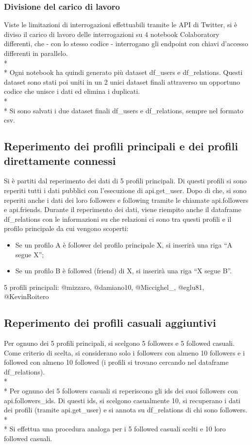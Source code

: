 \documentclass[a4paper, 12pt, twoside]{article}
\begin{document}
\subsubsection{Divisione del carico di lavoro}
Viste le limitazioni di interrogazioni effettuabili tramite le API di Twitter, si è diviso il carico di lavoro delle interrogazioni su 4 notebook Colaboratory differenti, che - con lo stesso codice -  interrogano gli endpoint con chiavi d’accesso differenti in parallelo. \\* \\*
Ogni notebook ha quindi generato più dataset df\_users e df\_relations. Questi dataset sono stati poi uniti in un 2 unici dataset finali attraverso un opportuno codice che unisce i dati ed elimina i duplicati. \\* \\*
Si sono salvati i due dataset finali df\_users e df\_relations, sempre nel formato csv.


\subsection{Reperimento dei profili principali e dei profili direttamente connessi} 
Si è partiti dal reperimento dei dati di 5 profili principali. Di questi profili si sono reperiti tutti i dati pubblici con l'esecuzione di api.get\_user. Dopo di che, si sono reperiti anche i dati dei loro followers e following tramite le chiamate api.followers e api.friends. Durante il reperimento dei dati, viene riempito anche il dataframe df\_relations con le informazioni su che relazioni ci sono tra questi profili e il profilo principale da cui vengono scoperti:
\begin{itemize}
    \item Se un profilo A è follower del profilo principale X, si inserirà una riga “A segue X”;
    \item Se un profilo B è followed (friend) di X, si inserirà una riga “X segue B”.
\end{itemize}
5 profili principali:    @mizzaro, @damiano10, @Miccighel\_, @eglu81, @KevinRoitero


\subsection{Reperimento dei profili casuali aggiuntivi}
Per ognuno dei 5 profili principali, si scelgono 5 followers e 5 followed casuali. Come criterio di scelta, si considerano solo i followers con almeno 10 followers e i followed con almeno 10 followed (i profili si trovano cercando nel dataframe df\_relations). \\* \\*
Per ognuno dei 5 followers casuali si reperiscono gli ids dei suoi followers con  api.followers\_ids. Di questi ids, si scelgono casualmente 10, si recuperano i dati dei profili (tramite  api.get\_user) e si annota su df\_relations di chi sono followers. \\* \\*
Si effettua una procedura analoga per i 5 followed casuali scelti e 10 loro followed casuali.
\end{document}
